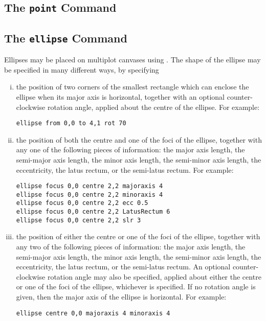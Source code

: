 \subsection{The {\tt point} Command}
\label{sec:point}

\subsection{The {\tt ellipse} Command}
\label{sec:ellipse}

Ellipses may be placed on multiplot canvases using . The shape
of the ellipse may be specified in many different ways, by specifying

\begin{enumerate}[(i)]
\item the position of two corners of the smallest rectangle which can enclose
the ellipse when its major axis is horizontal, together with an optional
counter-clockwise rotation angle, applied about the centre of the ellipse.
For example:

\begin{verbatim}
ellipse from 0,0 to 4,1 rot 70
\end{verbatim}

\item the position of both the centre and one of the foci of the ellipse,
together with any one of the following pieces of information: the major axis
length, the semi-major axis length, the minor axis length, the semi-minor axis
length, the eccentricity, the latus rectum, or the semi-latus rectum.  For
example:

\begin{verbatim}
ellipse focus 0,0 centre 2,2 majoraxis 4
ellipse focus 0,0 centre 2,2 minoraxis 4
ellipse focus 0,0 centre 2,2 ecc 0.5
ellipse focus 0,0 centre 2,2 LatusRectum 6
ellipse focus 0,0 centre 2,2 slr 3
\end{verbatim}

\item the position of either the centre or one of the foci of the ellipse,
together with any two of the following pieces of information: the major axis
length, the semi-major axis length, the minor axis length, the semi-minor axis
length, the eccentricity, the latus rectum, or the semi-latus rectum. An
optional counter-clockwise rotation angle may also be specified, applied about
either the centre or one of the foci of the ellipse, whichever is specified. If
no rotation angle is given, then the major axis of the ellipse is horizontal.
For example:

\begin{verbatim}
ellipse centre 0,0 majoraxis 4 minoraxis 4
\end{verbatim}
\end{enumerate}

